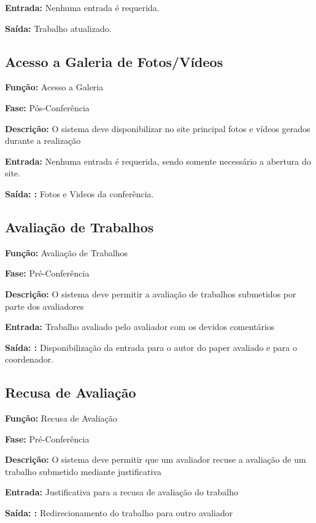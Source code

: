 \documentclass[letter]{article}
\begin{document}
\textbf{Entrada:}  Nenhuma entrada é requerida.

\textbf{Saída:}  Trabalho atualizado.



\subsection{Acesso a Galeria de Fotos/Vídeos}

\textbf{Função:} Acesso a Galeria

\textbf{Fase: } Pós-Conferência

\textbf{Descrição: } O sistema deve disponibilizar no site principal fotos e vídeos gerados durante a realização

\textbf{Entrada: } Nenhuma entrada é requerida, sendo somente necessário a abertura do site.

\textbf{Saída: :} Fotos e Videos da conferência.



\subsection{ Avaliação de Trabalhos}

\textbf{Função:} Avaliação de Trabalhos

\textbf{Fase: } Pré-Conferência

\textbf{Descrição: } O sistema deve permitir a avaliação de trabalhos submetidos por parte dos avaliadores

\textbf{Entrada: } Trabalho avaliado pelo avaliador com os devidos comentários

\textbf{Saída: :} Disponibilização da entrada para o autor do paper avaliado e para o coordenador.


\subsection{ Recusa de Avaliação}

\textbf{Função:} Recusa de Avaliação

\textbf{Fase: } Pré-Conferência

\textbf{Descrição: } O sistema deve permitir que um avaliador recuse a avaliação de um trabalho submetido mediante justificativa

\textbf{Entrada: } Justificativa para a recusa de avaliação do trabalho

\textbf{Saída: :} Redirecionamento do trabalho para outro avaliador
\end{document}
